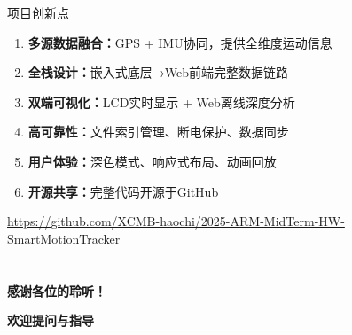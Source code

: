 \documentclass[10pt,aspectratio=169,mathserif]{beamer}
\begin{document}
\begin{frame}{项目创新点}
\begin{enumerate}
    \item \textbf{多源数据融合：}GPS + IMU协同，提供全维度运动信息
    \item \textbf{全栈设计：}嵌入式底层→Web前端完整数据链路
    \item \textbf{双端可视化：}LCD实时显示 + Web离线深度分析
    \item \textbf{高可靠性：}文件索引管理、断电保护、数据同步
    \item \textbf{用户体验：}深色模式、响应式布局、动画回放
    \item \textbf{开源共享：}完整代码开源于GitHub
\end{enumerate}

\vspace{0.5cm}
\begin{center}
\url{https://github.com/XCMB-haochi/2025-ARM-MidTerm-HW-SmartMotionTracker}
\end{center}
\end{frame}

\section*{}

\begin{frame}
    \vfill
    \centering
    \Huge \textbf{感谢各位的聆听！}

    \vspace{1cm}

    \Large \textbf{欢迎提问与指导}
    \vfill
\end{frame}
\end{document}
